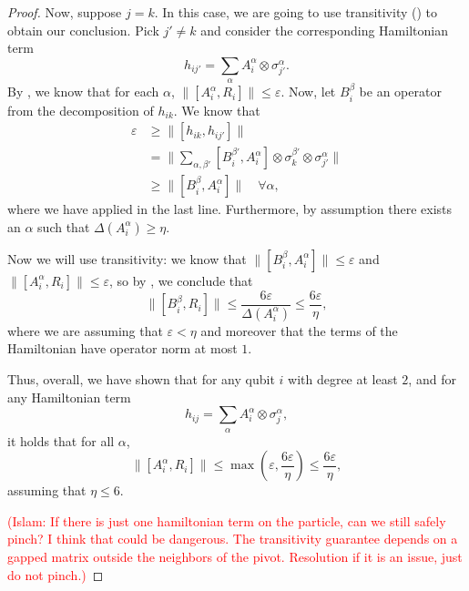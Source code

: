 \documentclass[11pt]{article}
\theoremstyle{plain}
\newcommand{\eps}{\varepsilon}
\newcommand{\IslamNote}[1]{\textcolor{red}{(Islam: #1)}}
\newcommand{\IslamNote}[1]{}
\begin{document}
\begin{proof}
Now, suppose $j = k$. In this case, we are going to use transitivity () to obtain our conclusion. Pick $j' \neq k$ and consider the corresponding Hamiltonian term
\begin{equation}
    h_{ij'} = \sum_{\alpha} A_i^\alpha \otimes \sigma_{j'}^\alpha. 
\end{equation}
By , we know that for each $\alpha$, $\| [A_i^\alpha, R_i]\| \leq \eps.$ Now, let $B_i^\beta$ be an operator from the decomposition of $h_{ik}$. We know that
\begin{align}
    \eps &\geq \| [h_{ik}, h_{ij'}] \| \\
    &= \| \sum_{\alpha, \beta'} [B_i^{\beta'}, A_i^\alpha] \otimes \sigma_k^{\beta'} \otimes \sigma_{j'}^{\alpha} \| \\
    &\geq \| [ B_i^\beta, A_i^\alpha] \| \quad \forall \alpha,
\end{align}
where we have applied  in the last line. Furthermore, by assumption there exists an $\alpha$ such that $\Delta(A_i^\alpha) \geq \eta$. 

Now we will use transitivity: we know that $\|[B_i^\beta, A_i^\alpha]\| \leq \eps$ and $\|[A_i^\alpha, R_i]\| \leq \eps$, so by , we conclude that 
\begin{equation}
    \| [B_i^\beta, R_i] \| \leq \frac{6\eps}{\Delta(A_i^\alpha)} \leq \frac{6 \eps}{\eta},
\end{equation}
where we are assuming that $\eps < \eta$ and moreover that the terms of the Hamiltonian have operator norm at most $1$. 

Thus, overall, we have shown that for any qubit $i$ with degree at least $2$, and for any Hamiltonian term 
\begin{equation} h_{ij} = \sum_{\alpha } A_i^\alpha \otimes \sigma_j^{\alpha}, \end{equation}
it holds that for all $\alpha$, 
\begin{equation}
    \| [A_i^\alpha, R_i] \| \leq \max(\eps, \frac{6\eps}{\eta}) \leq \frac{6\eps}{\eta}, \label{eq:pivot-commutator}
\end{equation}
assuming that $\eta \leq 6$.


\IslamNote{If there is just one hamiltonian term on the particle, can we still safely pinch? I think that could be dangerous. The transitivity guarantee depends on a gapped matrix outside the neighbors of the pivot. Resolution if it is an issue, just do not pinch.}


\end{proof}
\end{document}
